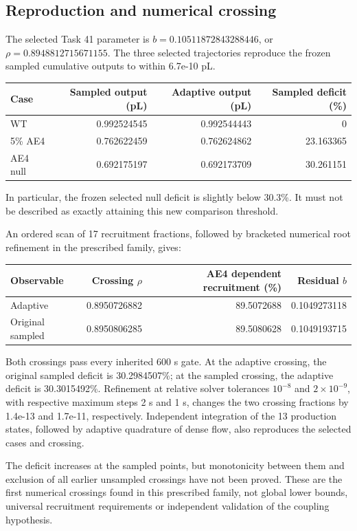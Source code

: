\subsection{Reproduction and numerical crossing}
The selected Task 41 parameter is
$b=0.10511872843288446$, or $\rho=0.8948812715671155$.
The three selected trajectories reproduce the frozen sampled cumulative
outputs to within 6.7e-10 pL.
\begin{center}
\begin{tabular}{lrrr}
\hline
Case & Sampled output (pL) & Adaptive output (pL) & Sampled deficit (\%) \\
\hline
WT & 0.992524545 & 0.992544443 & 0 \\
5\% AE4 & 0.762622459 & 0.762624862 & 23.163365 \\
AE4 null & 0.692175197 & 0.692173709 & 30.261151 \\
\hline
\end{tabular}
\end{center}
In particular, the frozen selected null deficit is slightly below 30.3\%.
It must not be described as exactly attaining this new comparison threshold.

An ordered scan of 17 recruitment fractions, followed by bracketed numerical
root refinement in the prescribed family, gives:
\begin{center}
\begin{tabular}{lrrr}
\hline
Observable & Crossing $\rho$ & AE4 dependent recruitment (\%) & Residual $b$ \\
\hline
Adaptive & 0.8950726882 & 89.5072688 & 0.1049273118 \\
Original sampled & 0.8950806285 & 89.5080628 & 0.1049193715 \\
\hline
\end{tabular}
\end{center}
Both crossings pass every inherited 600 s gate. At the adaptive crossing,
the original sampled deficit is 30.2984507\%;
at the sampled crossing, the adaptive deficit is
30.3015492\%.
Refinement at relative solver tolerances $10^{-8}$ and $2\times10^{-9}$,
with respective maximum steps 2 s and 1 s, changes the two crossing fractions
by 1.4e-13 and
1.7e-11, respectively.
Independent integration of the 13 production states, followed by adaptive
quadrature of dense flow, also reproduces the selected cases and crossing.

The deficit increases at the sampled points, but monotonicity between them
and exclusion of all earlier unsampled crossings have not been proved.
These are the first numerical crossings found in this prescribed family,
not global lower bounds, universal recruitment requirements or independent
validation of the coupling hypothesis.

